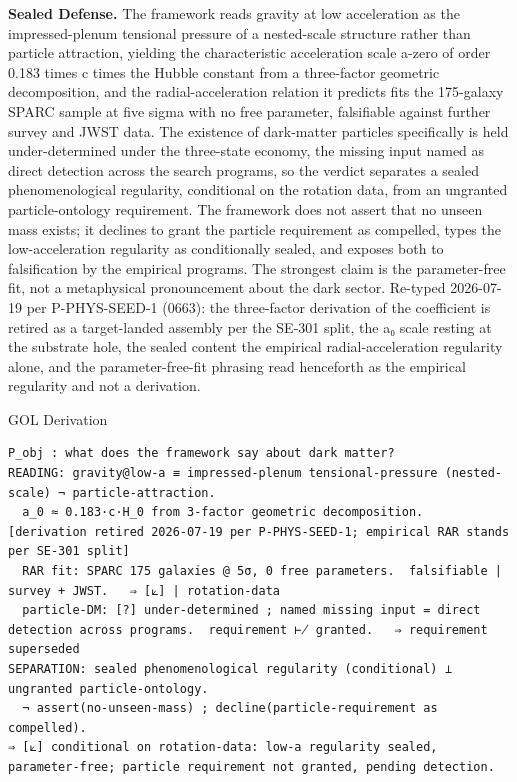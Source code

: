 \documentclass[10pt,twocolumn]{article}
\begin{document}
\textbf{Sealed Defense.} The framework reads gravity at low acceleration
as the impressed-plenum tensional pressure of a nested-scale structure
rather than particle attraction, yielding the characteristic
acceleration scale a-zero of order 0.183 times c times the Hubble
constant from a three-factor geometric decomposition, and the
radial-acceleration relation it predicts fits the 175-galaxy SPARC
sample at five sigma with no free parameter, falsifiable against further
survey and JWST data. The existence of dark-matter particles
specifically is held under-determined under the three-state economy, the
missing input named as direct detection across the search programs, so
the verdict separates a sealed phenomenological regularity, conditional
on the rotation data, from an ungranted particle-ontology requirement.
The framework does not assert that no unseen mass exists; it declines to
grant the particle requirement as compelled, types the low-acceleration
regularity as conditionally sealed, and exposes both to falsification by
the empirical programs. The strongest claim is the parameter-free fit,
not a metaphysical pronouncement about the dark sector. Re-typed
2026-07-19 per P-PHYS-SEED-1 (0663): the three-factor derivation of the
coefficient is retired as a target-landed assembly per the SE-301 split,
the a₀ scale resting at the substrate hole, the sealed content the
empirical radial-acceleration regularity alone, and the
parameter-free-fit phrasing read henceforth as the empirical regularity
and not a derivation.

\begin{golbox}{GOL Derivation}
\begin{lstlisting}[style=golv]
P_obj : what does the framework say about dark matter?
READING: gravity@low-a ≡ impressed-plenum tensional-pressure (nested-scale) ¬ particle-attraction.
  a_0 ≈ 0.183·c·H_0 from 3-factor geometric decomposition.  [derivation retired 2026-07-19 per P-PHYS-SEED-1; empirical RAR stands per SE-301 split]
  RAR fit: SPARC 175 galaxies @ 5σ, 0 free parameters.  falsifiable | survey + JWST.   ⇒ [⟀] | rotation-data
  particle-DM: [?] under-determined ; named missing input = direct detection across programs.  requirement ⊬ granted.   ⇒ requirement superseded
SEPARATION: sealed phenomenological regularity (conditional) ⊥ ungranted particle-ontology.
  ¬ assert(no-unseen-mass) ; decline(particle-requirement as compelled).
⇒ [⟀] conditional on rotation-data: low-a regularity sealed, parameter-free; particle requirement not granted, pending detection.
\end{lstlisting}
\end{golbox}
\end{document}
